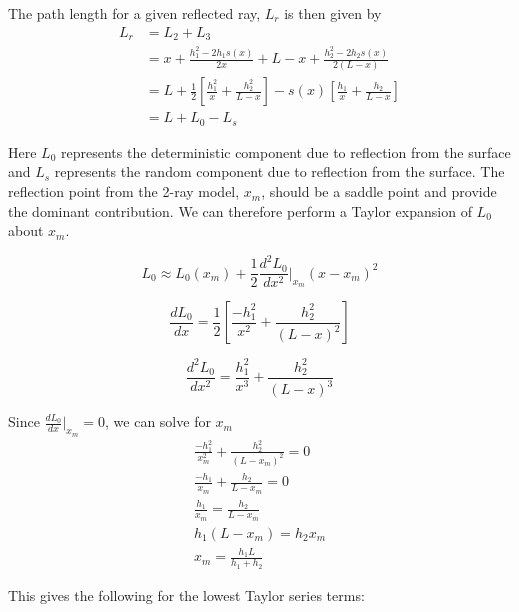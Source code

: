 The path length for a given reflected ray, $L_r$ is then given by
\begin{equation}
\begin{aligned}
L_r &= L_2 + L_3 \\
& = x + \frac{h_1^2-2h_1s(x)}{2x} +  L-x + \frac{h_2^2 - 2h_2s(x)}{2\left(L-x\right)} \\
& = L + \frac{1}{2}\left[\frac{h_1^2}{x} + \frac{h_2^2}{L-x} \right] - s(x)\left[ \frac{h_1}{x} + \frac{h_2}{L-x}\right] \\
&= L + L_0 - L_s
\end{aligned}
\label{mp_eq:13}
\end{equation}
\renewcommand{\baselinestretch}{2} \small\normalsize

Here $L_0$ represents the deterministic component due to reflection from the surface and $L_s$ represents the random component due to reflection from the surface. The reflection point from the 2-ray model, $x_m$, should be a saddle point and provide the dominant contribution. We can therefore perform a Taylor expansion of $L_0$ about $x_m$.

\begin{equation}
L_0 \approx L_0(x_m) + \frac{1}{2}\frac{d^2L_0}{dx^2}\bigg|_{x_m}(x-x_m)^2
\label{mp_eq:14}
\end{equation}

\begin{equation}
\frac{dL_0}{dx} = \frac{1}{2}\left[\frac{-h_1^2}{x^2} + \frac{h_2^2}{(L-x)^2} \right]
\label{mp_eq:15}
\end{equation}

\begin{equation}
\frac{d^2L_0}{dx^2} = \frac{h_1^2}{x^3} + \frac{h_2^2}{(L-x)^3} 
\label{mp_eq:16}
\end{equation}

Since $\frac{dL_0}{dx}\big|_{x_m} = 0$, we can solve for $x_m$
\begin{equation}
\begin{gathered}
\frac{-h_1^2}{x_m^2} + \frac{h_2^2}{(L-x_m)^2} = 0\\
\frac{-h_1}{x_m} + \frac{h_2}{L-x_m} = 0\\
\frac{h_1}{x_m} = \frac{h_2}{L-x_m}\\
h_1(L-x_m) = h_2x_m\\
x_m = \frac{h_1L}{h_1+h_2}
\end{gathered}
\label{mp_eq:17}
\end{equation}

This gives the following for the lowest Taylor series terms:

